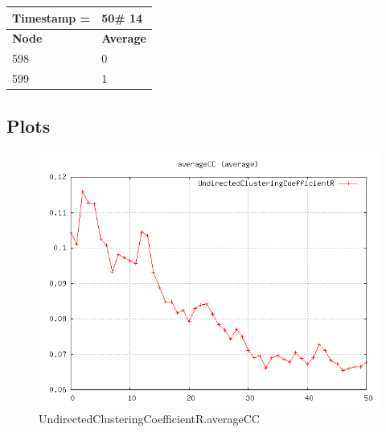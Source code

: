 \begin{tabular}{|l||l|}
\hline
\textbf{Timestamp =} & \textbf{50}\# 14\\\hline
	\textbf{Node} & \textbf{Average} \\ \hline
\hline
	598 & 0 \\ \hline
	599 & 1 \\ \hline
\end{tabular}


\subsection{Plots}

\begin{figure} [h]
	\centering
	\includegraphics [scale=0.8] {plots/UndirectedClusteringCoefficientR.averageCC}
	\caption{UndirectedClusteringCoefficientR.averageCC}
	\label{plot:RANDOM_100_500 - BARABASI_ALBERT_GROWTH_10_2.UndirectedClusteringCoefficientR.averageCC}
\end{figure}

